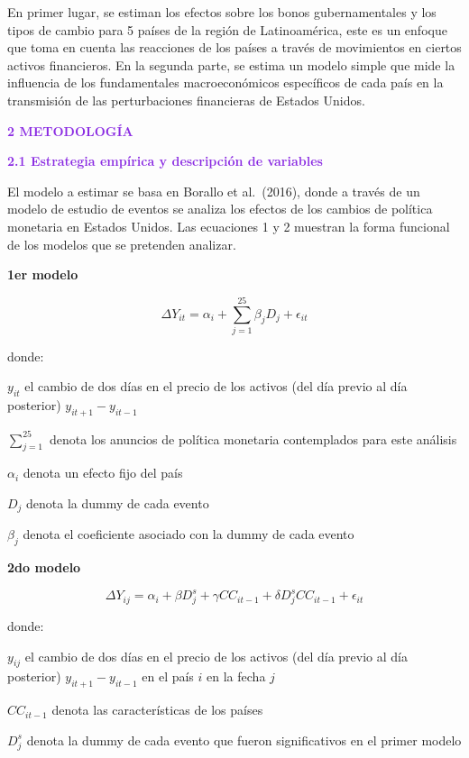 \documentclass[
  9.5pt,
]{article}
\begin{document}
En primer lugar, se estiman los efectos sobre los bonos gubernamentales
y los tipos de cambio para 5 países de la región de Latinoamérica, este
es un enfoque que toma en cuenta las reacciones de los países a través
de movimientos en ciertos activos financieros. En la segunda parte, se
estima un modelo simple que mide la influencia de los fundamentales
macroeconómicos específicos de cada país en la transmisión de las
perturbaciones financieras de Estados Unidos.

\textbf{\textcolor{BlueViolet}{2   METODOLOGÍA}}

\textbf{\textcolor{BlueViolet}{2.1   Estrategia empírica y descripción de variables}}

El modelo a estimar se basa en Borallo et al.~(2016), donde a través de
un modelo de estudio de eventos se analiza los efectos de los cambios de
política monetaria en Estados Unidos. Las ecuaciones 1 y 2 muestran la
forma funcional de los modelos que se pretenden analizar.

\textbf{1er modelo}

\begin{equation}
\Delta Y_{it} = \alpha_i+ \sum_{j=1}^{25}\beta_j D_j + \epsilon_{it}
\end{equation}

donde:

\(y_{it}\) el cambio de dos días en el precio de los activos (del día
previo al día posterior) \(y_{it+1}- y_{it-1}\)

\(\sum_{j=1}^{25}\) denota los anuncios de política monetaria
contemplados para este análisis

\(\alpha_i\) denota un efecto fijo del país

\(D_j\) denota la dummy de cada evento

\(\beta_j\) denota el coeficiente asociado con la dummy de cada evento

\textbf{2do modelo}

\begin{equation}
\Delta Y_{ij} = \alpha_i+ \beta D_j^s + \gamma CC_{it-1} + \delta D_j^s CC_{it-1} +\epsilon_{it}
\end{equation}

donde:

\(y_{ij}\) el cambio de dos días en el precio de los activos (del día
previo al día posterior) \(y_{it+1}- y_{it-1}\) en el país \(i\) en la
fecha \(j\)

\(CC_{it-1}\) denota las características de los países

\(D_j^{s}\) denota la dummy de cada evento que fueron significativos en
el primer modelo
\end{document}
